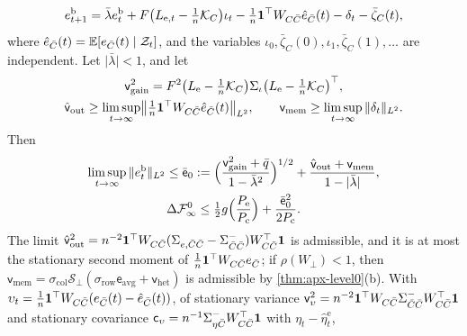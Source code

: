 \begin{proposition}
\begin{enumerate}
\begin{equation}\label{eq:apx-level0-belief-recursion}
e^{\mathrm b}_{t+1}=\bar\lambda e^{\mathrm b}_t+F\bigl(L_{\mathrm e,t}-\tfrac1n\mathcal{K}_C\bigr)\iota_t-\tfrac1n\mathbf{1}^\top W_{C\bar C}\hat e_{\bar C}(t)-\delta_t-\bar\zeta_C(t),
\end{equation}
where $\hat e_{\bar C}(t)=\mathbb{E}[e_{\bar C}(t)\mid\mathcal Z_t]$, and the variables $\iota_0,\bar\zeta_C(0),\iota_1,\bar\zeta_C(1),\dots$ are independent. Let $\lvert\bar\lambda\rvert<1$, and let
\begin{equation*}
\begin{gathered}
\mathsf v_{\mathrm{gain}}^2=F^2\bigl(L_{\mathrm e}-\tfrac1n\mathcal{K}_C\bigr)\Sigma_\iota\bigl(L_{\mathrm e}-\tfrac1n\mathcal{K}_C\bigr)^\top,\\
\hat{\mathsf v}_{\mathrm{out}}\ge\limsup_{t\to\infty}\bigl\Vert\tfrac1n\mathbf{1}^\top W_{C\bar C}\hat e_{\bar C}(t)\bigr\Vert_{L^2},\qquad\mathsf v_{\mathrm{mem}}\ge\limsup_{t\to\infty}\Vert\delta_t\Vert_{L^2} .
\end{gathered}
\end{equation*}
Then
\begin{equation}\label{eq:apx-level0-belief}
\begin{gathered}
\limsup_{t\to\infty}\Vert e^{\mathrm b}_t\Vert_{L^2}\le\bar{\mathsf e}_0:=\Bigl(\frac{\mathsf v_{\mathrm{gain}}^2+\bar q}{1-\bar\lambda^2}\Bigr)^{1/2}+\frac{\hat{\mathsf v}_{\mathrm{out}}+\mathsf v_{\mathrm{mem}}}{1-\lvert\bar\lambda\rvert},\\
\Delta\mathcal F^0_\infty\le\tfrac12g\Bigl(\frac{P_{\mathrm e}}{P_{\mathrm c}}\Bigr)+\frac{\bar{\mathsf e}_0^2}{2P_{\mathrm c}} .
\end{gathered}
\end{equation}
The limit $\hat{\mathsf v}_{\mathrm{out}}^2=n^{-2}\mathbf{1}^\top W_{C\bar C}(\Sigma_{e,\bar C\bar C}-\Sigma^-_{\bar C\bar C})W_{C\bar C}^\top\mathbf{1}$ is admissible, and it is at most the stationary second moment of $\frac1n\mathbf{1}^\top W_{C\bar C}e_{\bar C}$; if $\rho(W_\perp)<1$, then $\mathsf v_{\mathrm{mem}}=\sigma_{\mathrm{col}}\mathcal S_\perp(\sigma_{\mathrm{row}}\mathsf e_{\mathrm{avg}}+\mathsf v_{\mathrm{het}})$ is admissible by \cref{thm:apx-level0}(b). With $\upsilon_t=\frac1n\mathbf{1}^\top W_{C\bar C}(e_{\bar C}(t)-\hat e_{\bar C}(t))$, of stationary variance $\mathsf v_\upsilon^2=n^{-2}\mathbf{1}^\top W_{C\bar C}\Sigma^-_{\bar C\bar C}W_{C\bar C}^\top\mathbf{1}$ and stationary covariance $\mathsf c_\upsilon=n^{-1}\Sigma^-_{\eta\bar C}W_{C\bar C}^\top\mathbf{1}$ with $\eta_t-\hat\eta^{\mathrm e}_t$,
\begin{equation}\label{eq:apx-level0-belief-gain}

\end{equation}
\end{enumerate}
\end{proposition}
